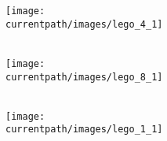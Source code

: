 \begin{activite}
        \partie[]
        \begin{minipage}{0.36\linewidth}
            \begin{center}
                \texttt{[image: \\currentpath/images/lego\_4\_1]}\\ [2.5mm]
                \makebox[\linewidth]{\dotfill} \\ [2.5mm]
                \makebox[\linewidth]{\dotfill} 
            \end{center}
        \end{minipage}
        \hspace{15mm}
        \begin{minipage}{0.3\linewidth}
            \begin{center}
                \texttt{[image: \\currentpath/images/lego\_8\_1]}\\ [2.5mm]
                \makebox[\linewidth]{\dotfill} \\ [2.5mm]
                \makebox[\linewidth]{\dotfill}
            \end{center}
        \end{minipage}
        \hspace{15mm}
        \begin{minipage}{0.3\linewidth}
            \begin{center}
                \texttt{[image: \\currentpath/images/lego\_1\_1]} \\ [2.5mm]
                \makebox[\linewidth]{\dotfill} \\ [2.5mm]
                \makebox[\linewidth]{\dotfill}
            \end{center}
        \end{minipage}


\end{activite}
